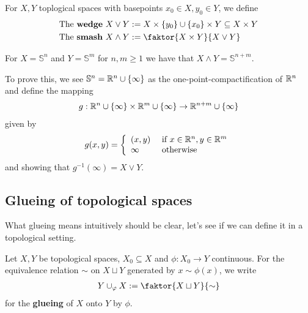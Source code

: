 \begin{dfn}
For $X, Y$ toplogical spaces with basepoints $x_0 \in X, y_0 \in Y$, we define
\begin{align*}
  \text{The \textbf{wedge} } X \vee Y &:= X \times \{y_0\} \cup \{x_0\} \times Y \subseteq X \times Y\\
  \text{The \textbf{smash} } X \wedge Y &:= \faktor{X \times Y}{X \vee Y}
\end{align*}
\end{dfn}

\begin{ex}[]
  For $X = \mathbb{S}^{n}$ and $Y = \mathbb{S}^{m}$ for $n,m \geq 1$ we have that $X \wedge Y = \mathbb{S}^{n+m}$.

To prove this, we see $\mathbb{S}^{n} = \mathbb{R}^{n} \cup \{\infty\}$ as the one-point-compactification of $\mathbb{R}^{n}$ and define the mapping \begin{align*}
  g: \mathbb{R}^{n} \cup \{\infty\} \times \mathbb{R}^{m} \cup \{\infty\} \to \mathbb{R}^{n+m} \cup \{\infty\}
\end{align*}
given by
\begin{align*}
  g(x,y) =
  \left\{\begin{array}{ll}
      (x,y)  & \text{ if } x \in \mathbb{R}^{n}, y \in \mathbb{R}^{m}\\
     \infty& \text{ otherwise}
  \end{array} \right.
\end{align*}
and showing that $g^{-1}(\infty) = X \vee Y$.
\end{ex}

\subsection{Glueing of topological spaces}
What glueing means intuitively should be clear, let's see if we can define it in a topological setting.

\begin{dfn}[]
Let $X,Y$ be topological spaces, $X_0 \subseteq X$ and $\phi: X_0 \to  Y$ continuous.
For the equivalence relation $\sim$ on $X \sqcup Y$ generated by $x \sim \phi(x)$, we write
\begin{align*}
  Y \cup_{\phi} X := \faktor{X \sqcup Y}{\sim}
\end{align*}
for the \textbf{glueing} of $X$ onto $Y$ by $\phi$.

\end{dfn}



